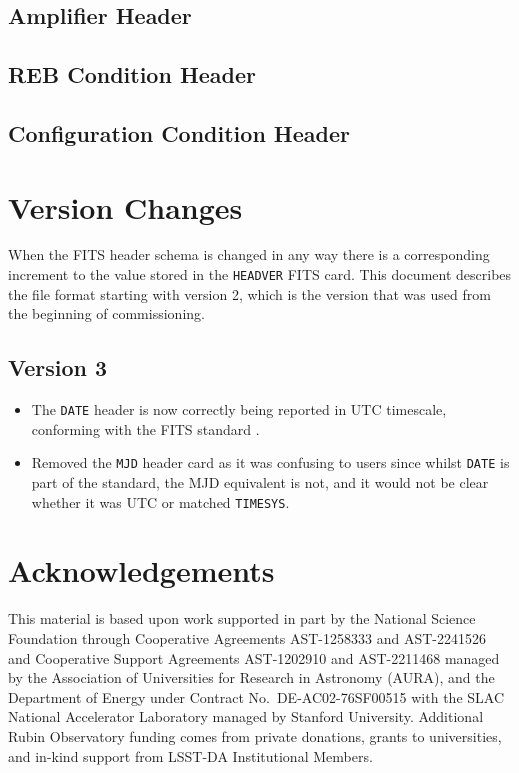 \documentclass[OPS,lsstdraft,authoryear,toc]{lsstdoc}
\begin{document}
\subsection{Amplifier Header}



\subsection{REB Condition Header}



\subsection{Configuration Condition Header}



\appendix

\section{Version Changes}

When the FITS header schema is changed in any way there is a corresponding increment to the value stored in the \texttt{HEADVER} FITS card.
This document describes the file format starting with version 2, which is the version that was used from the beginning of commissioning.

\subsection{Version 3}

\begin{itemize}
\item The \texttt{DATE} header is now correctly being reported in UTC timescale, conforming with the FITS standard \citep{2010A&A...524A..42P}.
\item Removed the \texttt{MJD} header card as it was confusing to users since whilst \texttt{DATE} is part of the standard, the MJD equivalent is not, and it would not be clear whether it was UTC or matched \texttt{TIMESYS}.
\end{itemize}

\section{Acknowledgements}

This material is based upon work supported in part by the National Science Foundation through Cooperative Agreements AST-1258333 and AST-2241526 and Cooperative Support Agreements AST-1202910 and AST-2211468 managed by the Association of Universities for Research in Astronomy (AURA), and the Department of Energy under Contract No.\ DE-AC02-76SF00515 with the SLAC National Accelerator Laboratory managed by Stanford University.
Additional Rubin Observatory funding comes from private donations, grants to universities, and in-kind support from LSST-DA Institutional Members.
\end{document}
